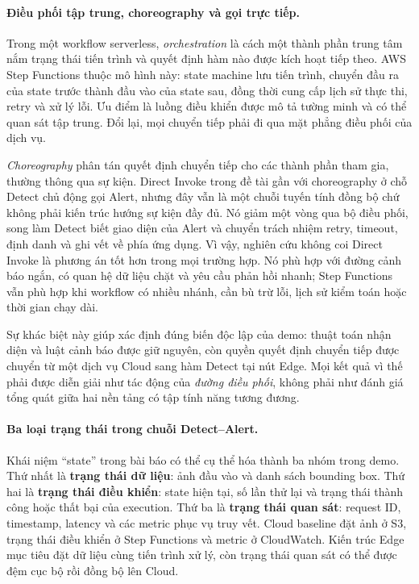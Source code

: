 \paragraph{Điều phối tập trung, choreography và gọi trực tiếp.}

Trong một workflow serverless, \emph{orchestration} là cách một thành phần trung
tâm nắm trạng thái tiến trình và quyết định hàm nào được kích hoạt tiếp theo. AWS
Step Functions thuộc mô hình này: state machine lưu tiến trình, chuyển đầu ra của
state trước thành đầu vào của state sau, đồng thời cung cấp lịch sử thực thi, retry
và xử lý lỗi. Ưu điểm là luồng điều khiển được mô tả tường minh và có thể quan sát
tập trung. Đổi lại, mọi chuyển tiếp phải đi qua mặt phẳng điều phối của dịch vụ.

\emph{Choreography} phân tán quyết định chuyển tiếp cho các thành phần tham gia,
thường thông qua sự kiện. Direct Invoke trong đề tài gần với choreography ở chỗ
Detect chủ động gọi Alert, nhưng đây vẫn là một chuỗi tuyến tính đồng bộ chứ không
phải kiến trúc hướng sự kiện đầy đủ. Nó giảm một vòng qua bộ điều phối, song làm
Detect biết giao diện của Alert và chuyển trách nhiệm retry, timeout, định danh và
ghi vết về phía ứng dụng. Vì vậy, nghiên cứu không coi Direct Invoke là phương án
tốt hơn trong mọi trường hợp. Nó phù hợp với đường cảnh báo ngắn, có quan hệ dữ
liệu chặt và yêu cầu phản hồi nhanh; Step Functions vẫn phù hợp khi workflow có
nhiều nhánh, cần bù trừ lỗi, lịch sử kiểm toán hoặc thời gian chạy dài.

Sự khác biệt này giúp xác định đúng biến độc lập của demo: thuật toán nhận diện và
luật cảnh báo được giữ nguyên, còn quyền quyết định chuyển tiếp được chuyển từ một
dịch vụ Cloud sang hàm Detect tại nút Edge. Mọi kết quả vì thế phải được diễn giải
như tác động của \emph{đường điều phối}, không phải như đánh giá tổng quát giữa hai
nền tảng có tập tính năng tương đương.

\paragraph{Ba loại trạng thái trong chuỗi Detect--Alert.}

Khái niệm ``state'' trong bài báo có thể cụ thể hóa thành ba nhóm trong demo. Thứ
nhất là \textbf{trạng thái dữ liệu}: ảnh đầu vào và danh sách bounding box. Thứ hai
là \textbf{trạng thái điều khiển}: state hiện tại, số lần thử lại và trạng thái
thành công hoặc thất bại của execution. Thứ ba là \textbf{trạng thái quan sát}:
request ID, timestamp, latency và các metric phục vụ truy vết. Cloud baseline đặt
ảnh ở S3, trạng thái điều khiển ở Step Functions và metric ở CloudWatch. Kiến trúc
Edge mục tiêu đặt dữ liệu cùng tiến trình xử lý, còn trạng thái quan sát có thể
được đệm cục bộ rồi đồng bộ lên Cloud.

